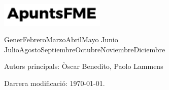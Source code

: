 \begin{titlepage}
	
	\vspace{2\baselineskip} %
	
	
	\vfill %
	
	
	\includegraphics[width=5cm]{../logo.pdf}
	
	\vspace{0.3\baselineskip} %
	
	
	{\ifcase \month \or Gener\or Febrero\or Marzo\or Abril\or Mayo \or Junio\or 
	Julio\or Agosto\or Septiembre\or Octubre\or Noviembre\or Diciembre\fi \:  
	\number \year}
	
	
	
\end{titlepage}

\thispagestyle{empty}

\vspace*{\fill}

\noindent Autors principals: Òscar Benedito, Paolo Lammens

\quad

\noindent %

\quad

\noindent %

\quad

\noindent Darrera modificació: \today.

\doclicenseThis
